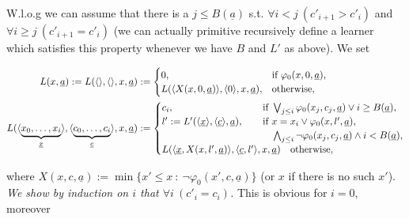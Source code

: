 \documentclass[1p]{elsarticle}
\newcommand{\tup}{\underline} %
\newcommand{\Tif}{\text{if}\ }
\newcommand{\Telse}{\text{otherwise}}
\theoremstyle{plain}
\theoremstyle{definition}
\theoremstyle{remark}
\renewenvironment{proof}[1][]{\noindent{\bf Proof{#1}. }}{\nopagebreak[4]{\hspace*{\fill}


  $\Box$              %

 }{\vspace{2ex}}}
\renewcommand{\phi}{\varphi}
\theoremstyle{definition}
\begin{document}
\begin{proof}

W.l.o.g we can assume that there is a $j\leq B(\tup a)$ s.t. $\forall i<j\ 

(c'_{i+1}>c'_i)$ and $\forall i\geq j\ (c'_{i+1}=c'_i)$ (we can actually primitive recursively define a learner which satisfies this property whenever we have $B$ and $L'$ as above). We set

\begin{align*}

L(x, \tup a):=L(\langle\rangle,\langle\rangle,x, \tup a)&:=\begin{cases}

0,&\Tif \phi_0(x,0,\tup a),\\

L( \langle X(x,0,\tup a)\rangle,\langle0\rangle,x,\tup a),&\Telse,\end{cases}\\ L(\langle \underbrace{x_0,\ldots,x_i}_{\tup x}\rangle, \langle \underbrace{c_0,\ldots,c_i}_{\tup c}\rangle,x,\tup a)&:=\begin{cases}

c_i,& \hspace*{-10mm}\Tif \bigvee_{j\leq i}\phi_0(x_j,c_j,\tup a)\vee i\ge B(\underline{a}),\\

l':=L'(\langle {\tup x}\rangle, \langle {\tup c}\rangle,\tup a),&

\hspace*{-10mm}\Tif x=x_i\vee \phi_0(x,l',\tup a),\\

&\hspace*{-10mm}\phantom{\Tif} \bigwedge_{j\leq i}\neg\phi_0(x_j,c_j,\tup a)\wedge i< 

B(\underline{a}),\\

L( \langle {\tup x},X(x,l',\tup a)\rangle,

\langle \tup c,l'\rangle,x,\tup a) &\Telse,

\end{cases}\\

\end{align*}

where $X(x,c,\tup a):=\min\{x'\leq x\ :\ \neg \phi_0(x',c,\tup a)\}$ (or $x$ if there is no such $x'$). \\

{\em We show by induction on $i$ that $\forall i\ (c'_i = c_i)$.} This is obvious for $i=0$, moreover 


\end{proof}
\end{document}
